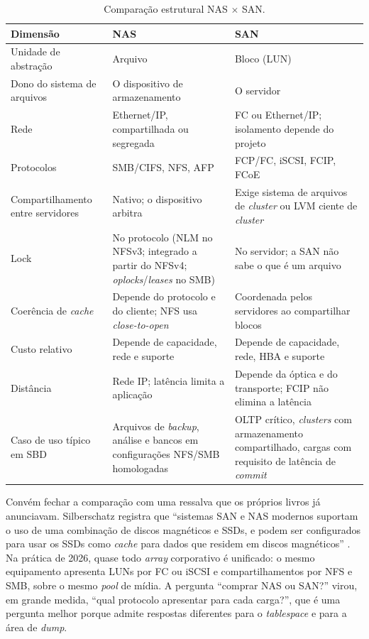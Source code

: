 \documentclass[11pt,a4paper]{article}
\begin{document}
\begin{table}[H]
\centering
\caption{Comparação estrutural NAS $\times$ SAN.}
\label{tab:nasxsan}
{\footnotesize
\begin{tabular}{@{}p{3.5cm}p{5.5cm}p{5.5cm}@{}}
\toprule
\textbf{Dimensão} & \textbf{NAS} & \textbf{SAN} \\
\midrule
Unidade de abstração & Arquivo & Bloco (LUN) \\
Dono do sistema de arquivos & O dispositivo de armazenamento & O servidor \\
Rede & Ethernet/IP, compartilhada ou segregada & FC ou Ethernet/IP; isolamento depende do projeto \\
Protocolos & SMB/CIFS, NFS, AFP & FCP/FC, iSCSI, FCIP, FCoE \\
Compartilhamento entre servidores & Nativo; o dispositivo arbitra & Exige sistema de arquivos de
\textit{cluster} ou LVM ciente de \textit{cluster} \\
Lock & No protocolo (NLM no NFSv3; integrado a partir do NFSv4; \textit{oplocks}/\textit{leases}
no SMB) & No servidor; a SAN não sabe o que é um arquivo \\
Coerência de \textit{cache} & Depende do protocolo e do cliente; NFS usa \textit{close-to-open} \cite{nfsman} & Coordenada pelos servidores ao compartilhar blocos \\
Custo relativo & Depende de capacidade, rede e suporte & Depende de capacidade, rede, HBA e suporte \\
Distância & Rede IP; latência limita a aplicação & Depende da óptica e do transporte; FCIP não elimina a latência \\
Caso de uso típico em SBD & Arquivos de \textit{backup}, análise e bancos em configurações NFS/SMB homologadas & OLTP crítico, \textit{clusters} com
armazenamento compartilhado, cargas com requisito de latência de \textit{commit} \\
\bottomrule
\end{tabular}}
\end{table}

Convém fechar a comparação com uma ressalva que os próprios livros já anunciavam. Silberschatz
registra que ``sistemas SAN e NAS modernos suportam o uso de uma combinação de discos magnéticos e
SSDs, e podem ser configurados para usar os SSDs como \textit{cache} para dados que residem em
discos magnéticos'' \cite{silberschatz2020}. Na prática de 2026, quase todo \textit{array}
corporativo é unificado: o mesmo equipamento apresenta LUNs por FC ou iSCSI e compartilhamentos por
NFS e SMB, sobre o mesmo \textit{pool} de mídia. A pergunta ``comprar NAS ou SAN?'' virou, em grande
medida, ``qual protocolo apresentar para cada carga?'', que é uma pergunta melhor porque admite
respostas diferentes para o \textit{tablespace} e para a área de \textit{dump}.
\end{document}
